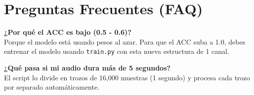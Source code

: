 \documentclass[11pt,a4paper]{article}
\begin{document}
\section{Preguntas Frecuentes (FAQ)}
\textbf{¿Por qué el ACC es bajo (0.5 - 0.6)?}\\
Porque el modelo está usando pesos al azar. Para que el ACC suba a 1.0, debes entrenar el modelo usando \texttt{train.py} con esta nueva estructura de 1 canal.

\textbf{¿Qué pasa si mi audio dura más de 5 segundos?}\\
El script lo divide en trozos de 16,000 muestras (1 segundo) y procesa cada trozo por separado automáticamente.
\end{document}
